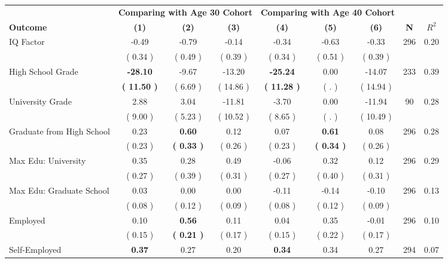 \begin{tabular}{lcccccccc}
\toprule
 & \multicolumn{3}{c}{\textbf{Comparing with Age 30 Cohort}} & \multicolumn{3}{c}{\textbf{Comparing with Age 40 Cohort}} & \\
\cmidrule(lr){2-4} \cmidrule(lr){5-7} 
 \textbf{Outcome} & \textbf{(1)} & \textbf{(2)} & \textbf{(3)} & \textbf{(4)} & \textbf{(5)} & \textbf{(6)} & \textbf{N} & \textbf{$ R^2$} \\
\midrule
IQ Factor &     -0.49 &     -0.79 &     -0.14 &     -0.34 &     -0.63 &     -0.33 & 296 &       0.20 \\ 
 & (     0.34 ) & (     0.49 ) & (     0.39 ) & (     0.34 ) & (     0.51 ) & (     0.39 ) & \\
High School Grade & \textbf{   -28.10} &     -9.67 &    -13.20 & \textbf{   -25.24} &      0.00 &    -14.07 & 233 &       0.39 \\ 
 & \textbf{(    11.50 )} & (     6.69 ) & (    14.86 ) & \textbf{(    11.28 )} & (        . ) & (    14.94 ) & \\
University Grade &      2.88 &      3.04 &    -11.81 &     -3.70 &      0.00 &    -11.94 & 90 &       0.28 \\ 
 & (     9.00 ) & (     5.23 ) & (    10.52 ) & (     8.65 ) & (        . ) & (    10.49 ) & \\
Graduate from High School &      0.23 & \textbf{     0.60} &      0.12 &      0.07 & \textbf{     0.61} &      0.08 & 296 &       0.28 \\ 
 & (     0.23 ) & \textbf{(     0.33 )} & (     0.26 ) & (     0.23 ) & \textbf{(     0.34 )} & (     0.26 ) & \\
Max Edu: University &      0.35 &      0.28 &      0.49 &     -0.06 &      0.32 &      0.12 & 296 &       0.29 \\ 
 & (     0.27 ) & (     0.39 ) & (     0.31 ) & (     0.27 ) & (     0.40 ) & (     0.31 ) & \\
Max Edu: Graduate School &      0.03 &      0.00 &      0.00 &     -0.11 &     -0.14 &     -0.10 & 296 &       0.13 \\ 
 & (     0.08 ) & (     0.12 ) & (     0.09 ) & (     0.08 ) & (     0.12 ) & (     0.09 ) & \\
Employed &      0.10 & \textbf{     0.56} &      0.11 &      0.04 &      0.35 &     -0.01 & 296 &       0.10 \\ 
 & (     0.15 ) & \textbf{(     0.21 )} & (     0.17 ) & (     0.15 ) & (     0.22 ) & (     0.17 ) & \\
Self-Employed & \textbf{     0.37} &      0.27 &      0.20 & \textbf{     0.34} &      0.34 &      0.27 & 294 &       0.07 \\ 

\end{tabular}
